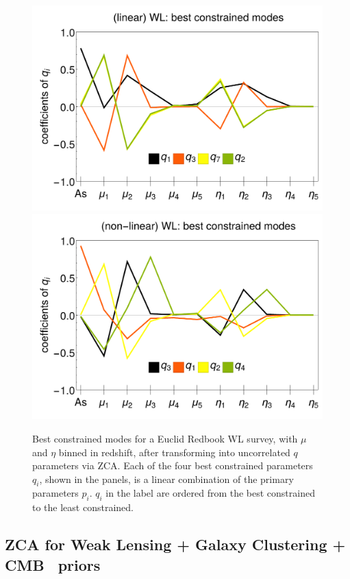 \begin{figure}[htbp]
	\centering{}\includegraphics[width=0.47\linewidth]{Chapters/linear-nonlinear-MG-forecasts/figures/Decorrelations-WL/linear_WL--_best_constrained_modes-Errors_on_q_ZCA_SquareNorm--_fiducialMGBin3_Euclid_WL_linearPK_}
	\includegraphics[width=0.47\linewidth]{Chapters/linear-nonlinear-MG-forecasts/figures/Decorrelations-WL/non-linear_WL--_best_constrained_modes-Errors_on_q_ZCA_SquareNorm--_fiducialMGBin3_Euclid_WL_nonlinearPk__Zhao_}
	\caption[Best constrained modes for Euclid GC applying ZCA.]{\label{fig:WLbestconst}
Best constrained modes for a Euclid Redbook WL survey, 
with $\mu$ and $\eta$ binned in redshift, after transforming into uncorrelated $q$ parameters via ZCA.
Each of the four best constrained parameters $q_i$, shown in the panels, is a linear combination of the primary parameters $p_i$. $q_i$ in the label are ordered from the best constrained to the least constrained.}
\end{figure}





\subsection{ZCA for Weak Lensing + Galaxy Clustering +  CMB \planck\ priors}

